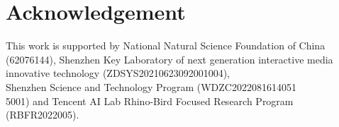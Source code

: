 \section{Acknowledgement}
\label{sec:conclusion}
This work is supported by National Natural Science Foundation of China (62076144), Shenzhen Key Laboratory of next generation interactive media innovative technology (ZDSYS20210623092001004),\\ Shenzhen Science and Technology Program (WDZC2022081614051\\5001) and Tencent AI Lab Rhino-Bird Focused Research Program (RBFR2022005).